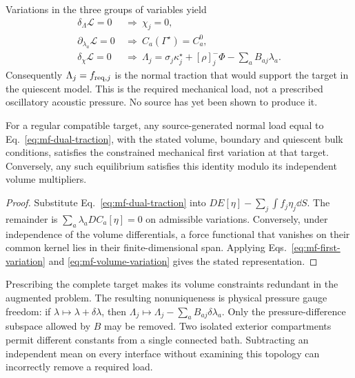 Variations in the three groups of variables yield
\begin{align}
 \delta_{\Lambda}\mathscr L=0&\ \Longrightarrow\ \chi_j=0,
 \label{eq:mf-kkt-shape}\\
 \partial_{\lambda_a}\mathscr L=0&\ \Longrightarrow\ C_a(\Gamma^\star)=C_a^0,
 \label{eq:mf-kkt-volume}\\
 \delta_\chi\mathscr L=0&\ \Longrightarrow\
 \boxed{\Lambda_j=\sigma_j\kappa_j^\star+[\rho]_j^-\Phi
 -\sum_aB_{aj}\lambda_a.}\label{eq:mf-dual-traction}
\end{align}
Consequently $\Lambda_j=f_{{\rm req},j}$ is the normal traction that would
support the target in the quiescent model. This is the required mechanical
load, not a prescribed oscillatory acoustic pressure. No source has yet
been shown to produce it.

\begin{proposition}
For a regular compatible target, any source-generated normal load equal to
Eq.~\eqref{eq:mf-dual-traction}, with the stated volume, boundary and
quiescent bulk conditions, satisfies the constrained mechanical first
variation at that target. Conversely, any such equilibrium satisfies this
identity modulo its independent volume multipliers.
\end{proposition}
\begin{proof}
Substitute Eq.~\eqref{eq:mf-dual-traction} into
$DE[\eta]-\sum_j\int f_j\eta_j\dd S$. The remainder is
$\sum_a\lambda_a DC_a[\eta]=0$ on admissible variations. Conversely,
under independence of the volume differentials, a force functional that
vanishes on their common kernel lies in their finite-dimensional span.
Applying Eqs.~\eqref{eq:mf-first-variation} and
\eqref{eq:mf-volume-variation} gives the stated representation.
\end{proof}

Prescribing the complete target makes its volume constraints redundant in
the augmented problem. The resulting nonuniqueness is physical pressure
gauge freedom: if $\lambda\mapsto\lambda+\delta\lambda$, then
$\Lambda_j\mapsto\Lambda_j-\sum_aB_{aj}\delta\lambda_a$.
Only the pressure-difference subspace allowed by $B$ may be removed.
Two isolated exterior compartments permit different constants from a
single connected bath. Subtracting an independent mean on every interface
without examining this topology can incorrectly remove a required load.


